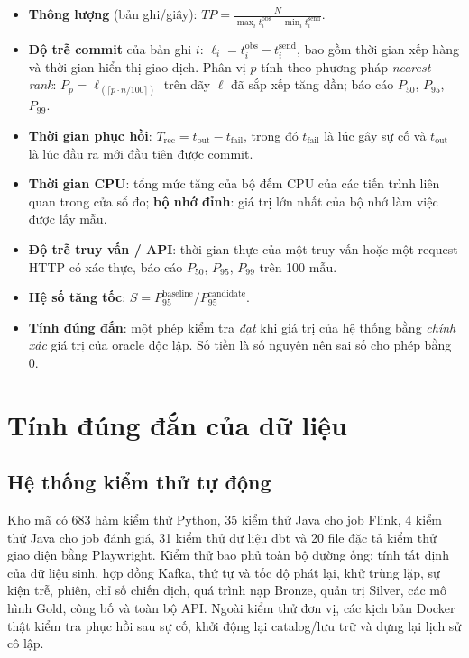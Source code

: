 \begin{itemize}
    \item \textbf{Thông lượng} (bản ghi/giây): $\displaystyle \mathit{TP} = \frac{N}{\max_i t^{\mathrm{obs}}_i - \min_i t^{\mathrm{send}}_i}$.
    \item \textbf{Độ trễ commit} của bản ghi $i$: $\ell_i = t^{\mathrm{obs}}_i - t^{\mathrm{send}}_i$, bao gồm thời gian xếp hàng và thời gian hiển thị giao dịch. Phân vị $p$ tính theo phương pháp \emph{nearest-rank}: $P_p = \ell_{(\lceil p \cdot n / 100 \rceil)}$ trên dãy $\ell$ đã sắp xếp tăng dần; báo cáo $P_{50}$, $P_{95}$, $P_{99}$.
    \item \textbf{Thời gian phục hồi}: $T_{\mathrm{rec}} = t_{\mathrm{out}} - t_{\mathrm{fail}}$, trong đó $t_{\mathrm{fail}}$ là lúc gây sự cố và $t_{\mathrm{out}}$ là lúc đầu ra mới đầu tiên được commit.
    \item \textbf{Thời gian CPU}: tổng mức tăng của bộ đếm CPU của các tiến trình liên quan trong cửa sổ đo; \textbf{bộ nhớ đỉnh}: giá trị lớn nhất của bộ nhớ làm việc được lấy mẫu.
    \item \textbf{Độ trễ truy vấn / API}: thời gian thực của một truy vấn hoặc một request HTTP có xác thực, báo cáo $P_{50}$, $P_{95}$, $P_{99}$ trên 100 mẫu.
    \item \textbf{Hệ số tăng tốc}: $S = P_{95}^{\mathrm{baseline}} / P_{95}^{\mathrm{candidate}}$.
    \item \textbf{Tính đúng đắn}: một phép kiểm tra \emph{đạt} khi giá trị của hệ thống bằng \emph{chính xác} giá trị của oracle độc lập. Số tiền là số nguyên nên sai số cho phép bằng 0.
\end{itemize}

\section{Tính đúng đắn của dữ liệu}
\label{sec:c5-dung-dan}

\subsection{Hệ thống kiểm thử tự động}
\label{sec:c5-kiem-thu}
Kho mã có 683 hàm kiểm thử Python, 35 kiểm thử Java cho job Flink, 4 kiểm thử Java cho job đánh giá, 31 kiểm thử dữ liệu dbt và 20 file đặc tả kiểm thử giao diện bằng Playwright. Kiểm thử bao phủ toàn bộ đường ống: tính tất định của dữ liệu sinh, hợp đồng Kafka, thứ tự và tốc độ phát lại, khử trùng lặp, sự kiện trễ, phiên, chỉ số chiến dịch, quá trình nạp Bronze, quản trị Silver, các mô hình Gold, công bố và toàn bộ API. Ngoài kiểm thử đơn vị, các kịch bản Docker thật kiểm tra phục hồi sau sự cố, khởi động lại catalog/lưu trữ và dựng lại lịch sử cô lập.

